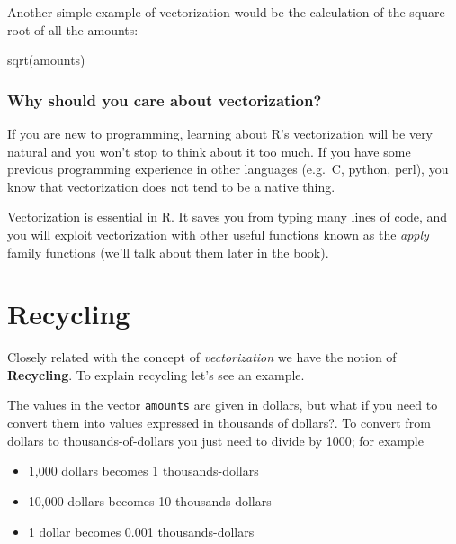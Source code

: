 \documentclass[
]{book}
\newenvironment{Shaded}{\begin{snugshade}}{\end{snugshade}}
\newcommand{\FunctionTok}[1]{\textcolor[rgb]{0.00,0.00,0.00}{#1}}
\newcommand{\NormalTok}[1]{#1}
\providecommand{\tightlist}{%
  \setlength{\itemsep}{0pt}\setlength{\parskip}{0pt}}
\begin{document}
Another simple example of vectorization would be the calculation of the square
root of all the amounts:

\begin{Shaded}
\begin{Highlighting}[]
\FunctionTok{sqrt}\NormalTok{(amounts)}
\end{Highlighting}
\end{Shaded}

\hypertarget{why-should-you-care-about-vectorization}{%
\subsubsection*{Why should you care about vectorization?}\label{why-should-you-care-about-vectorization}}

If you are new to programming, learning about R's vectorization will be very
natural and you won't stop to think about it too much. If you have some previous
programming experience in other languages (e.g.~C, python, perl), you know
that vectorization does not tend to be a native thing.

Vectorization is essential in R. It saves you from typing many lines of code,
and you will exploit vectorization with other useful functions known as the
\emph{apply} family functions (we'll talk about them later in the book).

\hypertarget{recycling}{%
\section{Recycling}\label{recycling}}

Closely related with the concept of \emph{vectorization} we have the notion of
\textbf{Recycling}. To explain recycling let's see an example.

The values in the vector \texttt{amounts} are given in dollars, but what if you need
to convert them into values expressed in thousands of dollars?. To convert
from dollars to thousands-of-dollars you just need to divide by 1000; for
example

\begin{itemize}
\tightlist
\item
  1,000 dollars becomes 1 thousands-dollars
\item
  10,000 dollars becomes 10 thousands-dollars
\item
  1 dollar becomes 0.001 thousands-dollars
\end{itemize}
\end{document}
